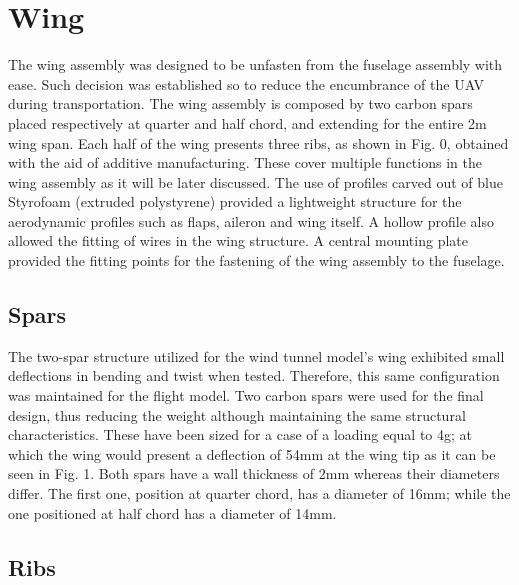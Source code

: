 \documentclass[../../main.tex]{subfiles}
\begin{document}

\section{Wing} \label{sec:final-design-proposal:wing}

The wing assembly was designed to be unfasten from the fuselage assembly with ease.
Such decision was established so to reduce the encumbrance of the UAV during transportation.
The wing assembly is composed by two carbon spars placed respectively at quarter and half chord, and extending for the entire 2m wing span.
Each half of the wing presents three ribs, as shown in Fig.
0, obtained with the aid of additive manufacturing.
These cover multiple functions in the wing assembly as it will be later discussed.
The use of profiles carved out of blue Styrofoam (extruded polystyrene) provided a lightweight structure for the aerodynamic profiles such as flaps, aileron and wing itself.
A hollow profile also allowed the fitting of wires in the wing structure.
A central mounting plate provided the fitting points for the fastening of the wing assembly to the fuselage.

\subsection{Spars} \label{sec:final-design-proposal:wing:spars}

The two-spar structure utilized for the wind tunnel model’s wing exhibited small deflections in bending and twist when tested.
Therefore, this same configuration was maintained for the flight model.
Two carbon spars were used for the final design, thus reducing the weight although maintaining the same structural characteristics.
These have been sized for a case of a loading equal to 4g; at which the wing would present a deflection of 54mm at the wing tip as it can be seen in Fig. 1.
Both spars have a wall thickness of 2mm whereas their diameters differ.
The first one, position at quarter chord, has a diameter of 16mm; while the one positioned at half chord has a diameter of 14mm.


\subsection{Ribs} \label{sec:final-design-proposal:wing:ribs}
\end{document}
